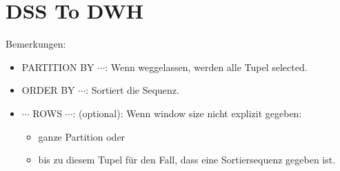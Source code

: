 
\section{DSS To DWH}

\begin{breakbox}
Bemerkungen:
\begin{itemize}
	\item PARTITION BY $\cdots$: Wenn weggelassen, werden alle Tupel selected.
	\item ORDER BY $\cdots$: Sortiert die Sequenz.
	\item $\cdots$ ROWS $\cdots$: (optional): Wenn window size nicht explizit gegeben:
		\begin{itemize}
			\item ganze Partition oder
			\item bis zu diesem Tupel für den Fall, dass eine Sortiersequenz gegeben ist.
		\end{itemize}
\end{itemize}
\end{breakbox}

\begin{breakbox}
\end{breakbox}

\begin{breakbox}
\end{breakbox}

\begin{breakbox}
\end{breakbox}

\begin{breakbox}
\end{breakbox}


